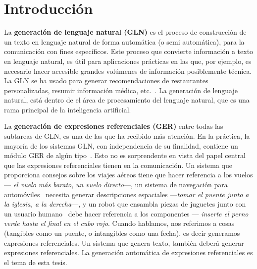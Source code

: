 \chapter{Introducci\'on}
\label{sec:intro}



La {\bf generaci\'on de lenguaje natural (GLN)} es el proceso de construcci\'on de un texto en lenguaje natural de forma autom\'atica (o semi autom\'atica), para la comunicaci\'on con fines espec\'ificos. Este proceso que convierte informaci\'on a texto en lenguaje natural, es \'util para aplicaciones pr\'acticas en las que, por ejemplo, es necesario hacer accesible grandes vol\'umenes de informaci\'on posiblemente t\'ecnica. La GLN se ha usado para generar recomendaciones de restaurantes personalizadas, resumir informaci\'on m\'edica, etc.~\cite{dale2000}. La generaci\'on de lenguaje natural, est\'a dentro de el \'area de procesamiento del lenguaje natural, que es una rama principal de la inteligencia artificial.

La \textbf {generaci\'on de expresiones referenciales (GER)} entre todas las subtareas de GLN, es una de las que ha recibido m\'as atenci\'on. En la pr\'actica, la mayor\'ia de los sistemas GLN, con independencia de su finalidad, contiene un m\'odulo GER de alg\'un tipo~\cite{Mellish2004}. Esto no es sorprendente
en vista del papel central que las expresiones referenciales tienen en la comunicaci\'on. Un sistema que proporciona
consejos sobre los viajes a\'ereos \cite{white2010generating} tiene que hacer referencia a los vuelos --- {\it el
vuelo m\'as barato}, {\it un vuelo directo}---, un sistema de navegaci\'on para autom\'oviles~\cite{Drager:2012:GLN:2380816.2380908}
necesita generar descripciones espaciales ---{\it tomar el puente junto a la iglesia, a la derecha}---,
y un robot que ensambla piezas de juguetes junto con un usuario humano~\cite{foster-etal-ijcai2009} debe hacer referencia a los componentes --- {\it inserte el perno verde hasta el final en el cubo rojo}. Cuando hablamos, nos referimos a cosas (tangibles como un puente, o intangibles como una fecha), es decir generamos expresiones referenciales. Un sistema que genera texto, tambi\'en deber\'a generar expresiones referenciales. La generaci\'on autom\'atica de expresiones referenciales es el tema de esta tesis.

